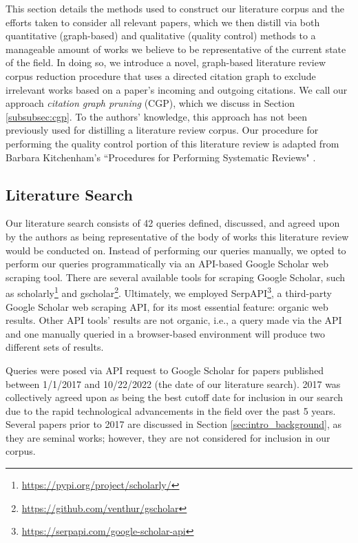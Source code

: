 \documentclass[manuscript,screen,review]{acmart}
\begin{document}
This section details the methods used to construct our literature corpus and the efforts taken to consider all relevant papers, which we then distill via both quantitative (graph-based) and qualitative (quality control) methods to a manageable amount of works we believe to be representative of the current state of the field. In doing so, we introduce a novel, graph-based literature review corpus reduction procedure that uses a directed citation graph to exclude irrelevant works based on a paper's incoming and outgoing citations. We call our approach \textit{citation graph pruning} (CGP), which we discuss in Section \ref{subsubsec:cgp}. To the authors' knowledge, this approach has not been previously used for distilling a literature review corpus. Our procedure for performing the quality control portion of this literature review is adapted from Barbara Kitchenham's ``Procedures for Performing Systematic Reviews" \cite{kitchenham2004procedures}.

\subsection{Literature Search} \label{subsec:literature_search}

Our literature search consists of 42 queries defined, discussed, and agreed upon by the authors as being representative of the body of works this literature review would be conducted on. Instead of performing our queries manually, we opted to perform our queries programmatically via an API-based Google Scholar web scraping tool. There are several available tools for scraping Google Scholar, such as scholarly\footnote{\href{https://pypi.org/project/scholarly/}{https://pypi.org/project/scholarly/}} and gscholar\footnote{\href{https://github.com/venthur/gscholar}{https://github.com/venthur/gscholar}}. Ultimately, we employed SerpAPI\footnote{\href{https://serpapi.com/google-scholar-api}{https://serpapi.com/google-scholar-api}}, a third-party Google Scholar web scraping API, for its most essential feature: organic web results. Other API tools' results are not organic, i.e., a query made via the API and one manually queried in a browser-based environment will produce two different sets of results.

Queries were posed via API request to Google Scholar for papers published between 1/1/2017 and 10/22/2022 (the date of our literature search). 2017 was collectively agreed upon as being the best cutoff date for inclusion in our search due to the rapid technological advancements in the field over the past 5 years. Several papers prior to 2017 are discussed in Section \ref{sec:intro_background}, as they are seminal works; however, they are not considered for inclusion in our corpus. 
\end{document}
